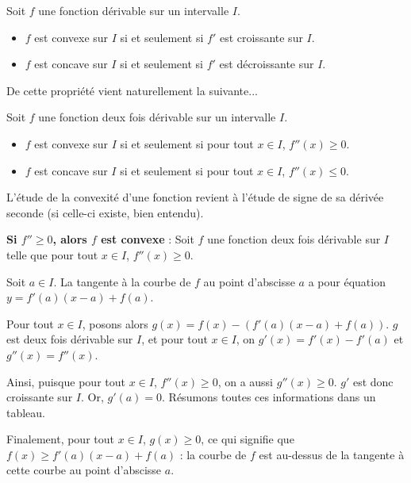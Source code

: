 \documentclass[11pt,fleqn, openany]{book} %
\begin{document}
\begin{proposition}Soit $f$ une fonction dérivable sur un intervalle $I$.
\begin{itemize}
\item $f$ est convexe sur $I$ si et seulement si $f'$ est croissante sur $I$.
\item $f$ est concave sur $I$ si et seulement si $f'$ est décroissante sur $I$.
\end{itemize}\end{proposition}

De cette propriété vient naturellement la suivante...

\begin{proposition}Soit $f$ une fonction deux fois dérivable sur un intervalle $I$.
\begin{itemize}
\item $f$ est convexe sur $I$ si et seulement si pour tout $x\in I$, $f''(x) \geqslant 0$.
\item $f$ est concave sur $I$ si et seulement si pour tout $x\in I$, $f''(x) \leqslant 0$. 
\end{itemize}
\end{proposition}

L'étude de la convexité d'une fonction revient à l'étude de signe de sa dérivée seconde (si celle-ci existe, bien entendu).

\begin{demonstration}\textbf{Si $f''\geqslant 0$, alors $f$ est convexe} : Soit $f$ une fonction deux fois dérivable sur $I$ telle que pour tout $x\in I$, $f''(x) \geqslant 0$.

Soit $a\in I$. La tangente à la courbe de $f$ au point d'abscisse $a$ a pour équation $y = f'(a)(x-a)+f(a)$.

Pour tout $x\in I$, posons alors $g(x)=f(x)-(f'(a)(x-a)+f(a))$. $g$ est deux fois dérivable sur $I$, et pour tout $x\in I$, on  $g'(x)=f'(x)-f'(a)$ et $g''(x)=f''(x)$.

Ainsi, puisque pour tout $x\in I$,  $f''(x)\geqslant 0$, on a aussi $g''(x) \geqslant 0$. $g'$ est donc croissante sur $I$. Or, $g'(a)=0$.
Résumons toutes ces informations dans un tableau.

\begin{center}
\end{center}

Finalement, pour tout $x\in I$, $g(x)\geqslant 0$, ce qui signifie que $f(x)\geqslant f'(a)(x-a)+f(a)$ : la courbe de $f$ est au-dessus de la tangente à cette courbe au point d'abscisse $a$.\end{demonstration}
\end{document}
